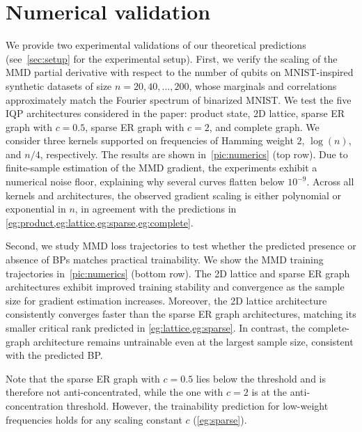 \documentclass{article}
\theoremstyle{plain}
\theoremstyle{definition}
\theoremstyle{remark}
\begin{document}
\section{Numerical validation} \label{sec:numerical-validation}
We provide two experimental validations of our theoretical predictions (see~\cref{sec:setup} for the experimental setup). First, we verify the scaling of the MMD partial derivative with respect to the number of qubits on MNIST-inspired synthetic datasets of size $n=20,40,\ldots,200$, whose marginals and correlations approximately match the Fourier spectrum of binarized MNIST. We test the five IQP architectures considered in the paper: product state, 2D lattice, sparse ER graph with $c=0.5$, sparse ER graph with $c=2$, and complete graph. We consider three kernels supported on frequencies of Hamming weight $2$, $\log(n)$, and $n/4$, respectively. The results are shown in~\cref{pic:numerics} (top row). Due to finite-sample estimation of the MMD gradient, the experiments exhibit a numerical noise floor, explaining why several curves flatten below $10^{-9}$. Across all kernels and architectures, the observed gradient scaling is either polynomial or exponential in $n$, in agreement with the predictions in \cref{eg:product,eg:lattice,eg:sparse,eg:complete}.

Second, we study MMD loss trajectories to test whether the predicted presence or absence of BPs matches practical trainability. We show the MMD training trajectories in~\cref{pic:numerics} (bottom row). The 2D lattice and sparse ER graph architectures exhibit improved training stability and convergence as the sample size for gradient estimation increases. Moreover, the 2D lattice architecture consistently converges faster than the sparse ER graph architectures, matching its smaller critical rank predicted in \cref{eg:lattice,eg:sparse}. In contrast, the complete-graph architecture remains untrainable even at the largest sample size, consistent with the predicted BP.

Note that the sparse ER graph with $c=0.5$ lies below the threshold and is therefore not anti-concentrated, while the one with $c=2$ is at the anti-concentration threshold. However, the trainability prediction for low-weight frequencies holds for any scaling constant $c$ (\cref{eg:sparse}).
\end{document}
